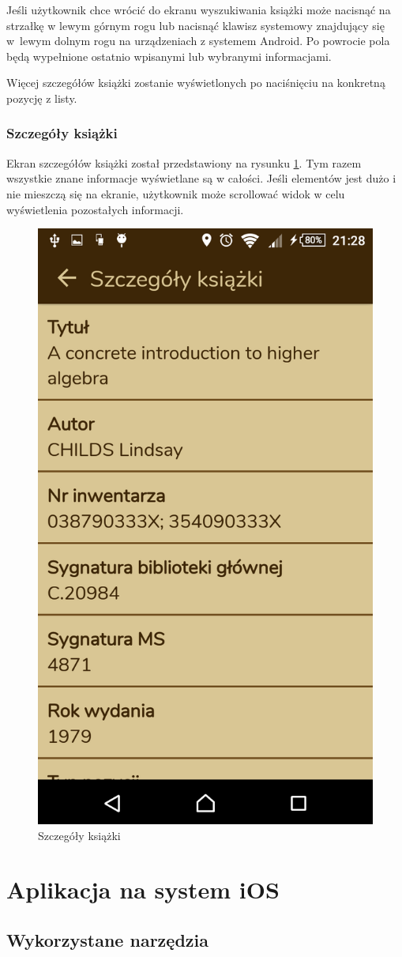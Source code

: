 \documentclass[twoside]{projektInzynierskiMS}
\begin{document}
Jeśli użytkownik chce wrócić do ekranu wyszukiwania książki może nacisnąć na strzałkę w lewym górnym rogu lub nacisnąć klawisz systemowy znajdujący się w~lewym dolnym rogu na urządzeniach z systemem Android. Po powrocie pola będą wypełnione ostatnio wpisanymi lub wybranymi informacjami.

Więcej szczegółów książki zostanie wyświetlonych po naciśnięciu na konkretną pozycję z listy. 

\subsubsection{Szczegóły książki}

Ekran szczegółów książki został przedstawiony na rysunku \ref{fig:anroidBookDetails}. Tym razem wszystkie znane informacje wyświetlane są w całości. Jeśli elementów jest dużo i nie mieszczą się na ekranie, użytkownik może scrollować widok w celu wyświetlenia pozostałych informacji.

\begin{figure}[h]
  \centering
  \includegraphics[width=0.4\linewidth]{img/android/android8.png}
  \caption{Szczegóły książki}
  \label{fig:anroidBookDetails}
\end{figure}



\section{Aplikacja na system iOS}

\subsection{Wykorzystane narzędzia}
\end{document}
